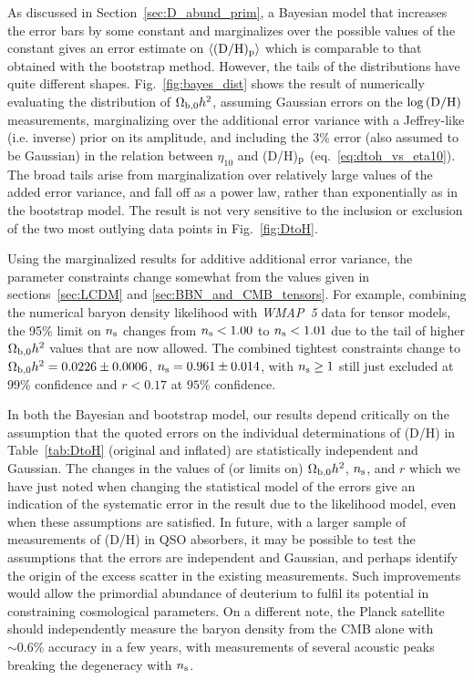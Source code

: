 \documentclass[useAMS,usenatbib]{mn2e}
\begin{document}
As discussed in Section~\ref{sec:D_abund_prim}, 
a Bayesian model that increases the error bars by some 
constant and marginalizes over the possible values 
of the constant gives an error estimate on 
$\langle ({\rm D/H})_{\rm p} \rangle$ which is comparable 
to that obtained with the bootstrap method. 
However, the tails of the distributions
have quite different shapes. 
Fig.~\ref{fig:bayes_dist} shows the result of numerically 
evaluating the  distribution of $\Omega_{\rm b,0} h^2$, 
assuming Gaussian errors on the $\log {\rm (D/H)}$ measurements, 
marginalizing over the additional error variance with a 
Jeffrey-like (i.e. inverse) prior on its amplitude, 
and including the 3\% error (also assumed to be Gaussian) 
in the relation between $\eta_{10}$ and (D/H)$_{\rm p}$
(eq.~\ref{eq:dtoh_vs_eta10}).
The broad tails arise from marginalization over 
relatively large values of the added error variance, 
and fall off as a power law, rather than exponentially 
as in the bootstrap model. The result is not very sensitive 
to the inclusion or exclusion of the two most outlying data
points in Fig.~\ref{fig:DtoH}.


Using the marginalized results for 
additive additional error variance, 
the parameter constraints change somewhat
from the values given in 
sections~\ref{sec:LCDM} and \ref{sec:BBN_and_CMB_tensors}.
For example, combining the numerical baryon 
density likelihood with \textit{WMAP~5} data 
for tensor models, 
the 95\% limit on $n_{\rm s}$ 
changes from $n_{\rm s} < 1.00$ to $n_{\rm s} < 1.01$ 
due to the tail of higher $\Omega_{\rm b,0} h^2$ values that are now allowed. 
The combined tightest 
constraints change to 
$\Omega_{\rm b,0} h^2 =  0.0226\pm 0.0006$, 
$n_{\rm s} = 0.961 \pm 0.014$, with $n_{\rm s} \geq 1$ 
still just excluded at 99\% confidence and 
$r < 0.17$ at $95\%$ confidence. 


In both the Bayesian and bootstrap model, 
our results depend 
critically on the assumption that the quoted
errors on the individual determinations of 
(D/H) in Table~\ref{tab:DtoH} (original and inflated) 
are statistically independent and Gaussian. 
The changes in the values of (or limits on) 
$\Omega_{\rm b,0} h^2$, 
$n_{\rm s}$, and $r$ which we have just noted when 
changing the statistical model of the errors
give an indication of the systematic error in the result 
due to the likelihood model, even when these assumptions are satisfied. 
In future, with a larger sample of measurements of (D/H) in
QSO absorbers, it may be possible to test the assumptions
that the errors are independent and Gaussian,
and perhaps identify the origin of the excess scatter in
the existing measurements. 
Such improvements would allow the primordial abundance
of deuterium to fulfil its potential in constraining cosmological
parameters.
On a different note, the Planck satellite should independently measure 
the baryon density from the CMB alone with $\sim 0.6\%$ accuracy
in a few years, 
with measurements of several acoustic peaks 
breaking the degeneracy with $n_{\rm s}$.
\end{document}
